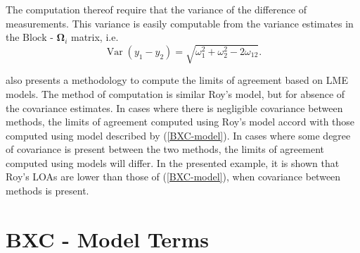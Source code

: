\documentclass[12pt, a4paper]{report}
\theoremstyle{plain}
\theoremstyle{definition}
\theoremstyle{remark}
\begin{document}
	The computation thereof require that the variance of the difference of measurements. This variance is easily computable from the  variance estimates in the ${\mbox{Block - }\boldsymbol \Omega_{i}}$ matrix, i.e.
	\[
	\operatorname{Var}(y_1 - y_2) = \sqrt{ \omega^2_1 + \omega^2_2 - 2\omega_{12}}.
	\]
	
	\citet{BXC2008} also presents a methodology to compute the limits of agreement based on LME models. The method of computation is similar Roy's model, but for absence of the covariance estimates. In cases where there is negligible covariance between methods, the limits of agreement computed using Roy's model accord with those computed using model described by (\ref{BXC-model}). In cases where some degree of covariance is present between the two methods, the limits of agreement computed using models will differ. In the presented example, it is shown that Roy's LOAs are lower than those of (\ref{BXC-model}), when covariance between methods is present.
	
%	
%	
%	
%	

	
	
	
	
	
	
	


	
	
	
	\section{BXC - Model Terms}
\end{document}
